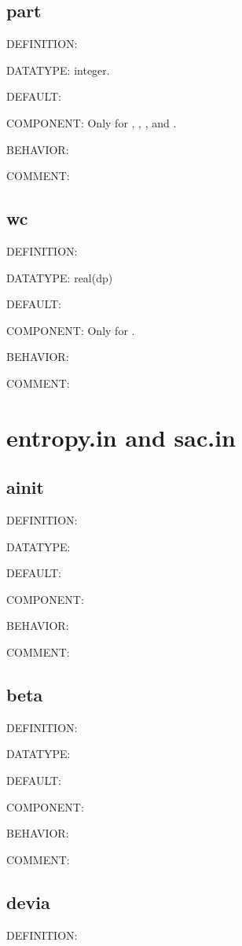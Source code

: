 \subsection{part}
{\color{red}DEFINITION:}

{\color{green}DATATYPE:} integer.

{\color{blue}DEFAULT:}

{\color{brown}COMPONENT:} Only for {\begonia}, {\lavender}, {\pansy}, and {\manjushaka}.

{\color{purple}BEHAVIOR:}

{\color{olive}COMMENT:}

\subsection{wc}
{\color{red}DEFINITION:}

{\color{green}DATATYPE:} real(dp)

{\color{blue}DEFAULT:}

{\color{brown}COMPONENT:} Only for {\narcissus}.

{\color{purple}BEHAVIOR:}

{\color{olive}COMMENT:}

\section{entropy.in and sac.in}
\subsection{ainit}
{\color{red}DEFINITION:}

{\color{green}DATATYPE:}

{\color{blue}DEFAULT:}

{\color{brown}COMPONENT:}

{\color{purple}BEHAVIOR:}

{\color{olive}COMMENT:}

\subsection{beta}
{\color{red}DEFINITION:}

{\color{green}DATATYPE:}

{\color{blue}DEFAULT:}

{\color{brown}COMPONENT:}

{\color{purple}BEHAVIOR:}

{\color{olive}COMMENT:}

\subsection{devia}
{\color{red}DEFINITION:}


